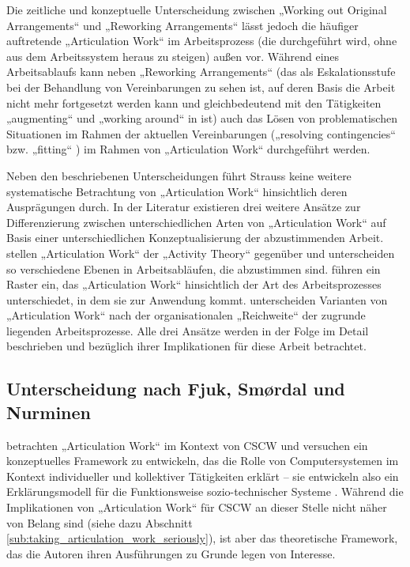 Die zeitliche und konzeptuelle Unterscheidung zwischen „Working out Original Arrangements“ und „Reworking Arrangements“ lässt jedoch die häufiger auftretende „Articulation Work“ im Arbeitsprozess (die durchgeführt wird, ohne aus dem Arbeitssystem heraus zu steigen) außen vor. Während eines Arbeitsablaufs kann neben „Reworking Arrangements“ (das als Eskalationsstufe bei der Behandlung von Vereinbarungen zu sehen ist, auf deren Basis die Arbeit nicht mehr fortgesetzt werden kann und gleichbedeutend mit den Tätigkeiten „augmenting“ und „working around“ in \citep{Gasser86} ist) auch das Lösen von problematischen Situationen im Rahmen der aktuellen Vereinbarungen („resolving contingencies“ \citep{Gerson86} bzw. „fitting“ \citep{Gasser86}) im Rahmen von „Articulation Work“ durchgeführt werden.

Neben den beschriebenen Unterscheidungen führt Strauss keine weitere systematische Betrachtung von „Articulation Work“ hinsichtlich deren Ausprägungen durch. In der Literatur existieren drei weitere Ansätze zur Differenzierung zwischen unterschiedlichen Arten von „Articulation Work“ auf Basis einer unterschiedlichen Konzeptualisierung der abzustimmenden Arbeit. \citet{Fjuk97} stellen „Articulation Work“ der „Activity Theory“ \citep{Leontev78} gegenüber und unterscheiden so verschiedene Ebenen in Arbeitsabläufen, die abzustimmen sind. \citet{Hampson05} führen ein Raster ein, das „Articulation Work“ hinsichtlich der Art des Arbeitsprozesses unterschiedet, in dem sie zur Anwendung kommt. \citet{Faergemann05} unterscheiden Varianten von „Articulation Work“ nach der organisationalen „Reichweite“ der zugrunde liegenden Arbeitsprozesse. Alle drei Ansätze werden in der Folge im Detail beschrieben und bezüglich ihrer Implikationen für diese Arbeit betrachtet.

\subsection{Unterscheidung nach Fjuk, Smørdal und Nurminen}
\label{sub:arten_fjuk}

\citet{Fjuk97} betrachten „Articulation Work“ im Kontext von \gls{CSCW} und versuchen ein konzeptuelles Framework zu entwickeln, das die Rolle von Computersystemen im Kontext individueller und kollektiver Tätigkeiten erklärt -- sie entwickeln also ein Erklärungsmodell für die Funktionsweise sozio-technischer Systeme \citep{Emery60}. Während die Implikationen von „Articulation Work“ für \gls{CSCW} an dieser Stelle nicht näher von Belang sind (siehe dazu Abschnitt \ref{sub:taking_articulation_work_seriously}), ist aber das theoretische Framework, das die Autoren ihren Ausführungen zu Grunde legen von Interesse. 

